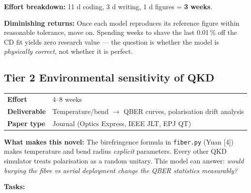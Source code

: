 \documentclass[11pt,a4paper]{article}
\begin{document}
\vspace{4pt}
\noindent\textbf{Effort breakdown:} 11 d coding, 3 d writing, 1 d figures = \textbf{3 weeks}.

\vspace{4pt}
\noindent\textbf{Diminishing returns:} Once each model reproduces its reference figure within
reasonable tolerance, move on.  Spending weeks to shave the last 0.01\,\% off the CD fit
yields zero research value --- the question is whether the model is \emph{physically correct},
not whether it is perfect.

\newpage

\subsection*{\color{tier2}Tier 2 \hfill Environmental sensitivity of QKD}

\begin{tabular}{ll}
\toprule
\textbf{Effort} & 4--8 weeks \\
\textbf{Deliverable} & Temperature/bend $\rightarrow$ QBER curves, polarisation drift analysis \\
\textbf{Paper type} & Journal (Optics Express, IEEE JLT, EPJ QT) \\
\bottomrule
\end{tabular}

\vspace{4pt}
\noindent\textbf{What makes this novel:} The birefringence formula in \texttt{fiber.py}
(Yuan [4]) makes temperature and bend radius \emph{explicit} parameters.  Every other QKD
simulator treats polarisation as a random unitary.  This model can answer: \emph{would burying
the fibre vs aerial deployment change the QBER statistics measurably?}

\vspace{4pt}
\noindent\textbf{Tasks:}
\end{document}
